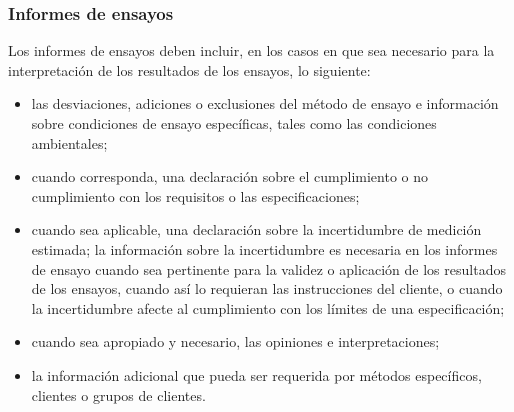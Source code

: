 \subsubsection{Informes de ensayos}
\par 
Los informes de ensayos deben incluir, en los casos en que sea necesario para la interpretación de los resultados de los ensayos, lo siguiente:\cite{iso17025}

\begin{itemize}
	\item las desviaciones, adiciones o exclusiones del método de ensayo e información sobre condiciones de
	ensayo específicas, tales como las condiciones ambientales;
	
	\item cuando corresponda, una declaración sobre el cumplimiento o no cumplimiento con los requisitos o las
	especificaciones;
	
	\item cuando sea aplicable, una declaración sobre la incertidumbre de medición estimada; la información
	sobre la incertidumbre es necesaria en los informes de ensayo cuando sea pertinente para la validez o
	aplicación de los resultados de los ensayos, cuando así lo requieran las instrucciones del cliente, o
	cuando la incertidumbre afecte al cumplimiento con los límites de una especificación;
	
	\item cuando sea apropiado y necesario, las opiniones e interpretaciones;
	
	\item la información adicional que pueda ser requerida por métodos específicos, clientes o grupos de clientes.
\end{itemize}
